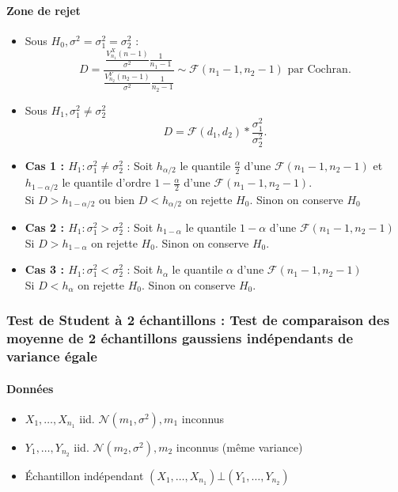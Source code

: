 \documentclass{article}
\theoremstyle{plain}%
\theoremstyle{definition}
\theoremstyle{remark}
\begin{document}
\paragraph*{Zone de rejet}
\begin{itemize}
    \item Sous $ H_0, \sigma ^2 = \sigma _1^2 = \sigma _2^2 $ : 
    \[
        D = \frac{\frac{V_{n_1}^X (n-1)}{\sigma ^2} \frac{1}{n_1-1}}{\frac{V_{n_2}^Y (n_2 -1)}{\sigma ^2} \frac{1}{n_2-1}} \sim \mathcal{F}(n_1 - 1, n_2 - 1) \text{ par Cochran}
    .\]
    \item Sous $ H_1, \sigma _1^2 \neq \sigma _2^2 $ 
    \[
        D = \mathcal{F}(d_1, d_2) * \frac{\sigma _1^2}{\sigma _2^2}
    .\]
\end{itemize}
\begin{itemize}
    \item \textbf{Cas 1 : $ H_1: \sigma _1^2 \neq \sigma _2^2 $ } : Soit $ h_{\alpha /2} $ le quantile $ \frac{\alpha }{2} $ d'une $ \mathcal{F}(n_1-1, n_2 - 1) $  et $ h_{1- \alpha /2} $ le quantile d'ordre $ 1 - \frac{\alpha }{2} $ d'une $ \mathcal{F}(n_1 - 1, n_2 - 1) $. \\
    Si $ D > h_{1 - \alpha /2} $ ou bien $ D < h_{\alpha /2} $ on rejette $ H_0 $. Sinon on conserve $ H_0 $ 

    \item \textbf{Cas 2 : $ H_1: \sigma _1^2 > \sigma _2^2 $ } : Soit $ h_{1 - \alpha} $ le quantile $ 1 -\alpha  $ d'une $ \mathcal{F}(n_1-1, n_2 - 1) $ \\
    Si $ D > h_{1 - \alpha} $ on rejette $ H_0 $. Sinon on conserve $ H_0 $.

    \item \textbf{Cas 3 : $ H_1: \sigma _1^2 < \sigma _2^2 $ } : Soit $ h_{\alpha} $ le quantile $ \alpha $ d'une $ \mathcal{F}(n_1-1, n_2 - 1) $ \\
    Si $ D < h_{\alpha} $ on rejette $ H_0 $. Sinon on conserve $ H_0 $.
\end{itemize}

\subsubsection{Test de Student à 2 échantillons : Test de comparaison des moyenne de 2 échantillons gaussiens indépendants de variance égale}

\paragraph*{Données}
\begin{itemize}
    \item $ X_1, \dots, X_{n_1}  $ iid. $ \mathcal{N}(m_1, \sigma ^2), m_1 $ inconnus
    \item $ Y_1, \dots, Y_{n_2}  $ iid. $ \mathcal{N}(m_2, \sigma ^2), m_2 $ inconnus (même variance)
    \item Échantillon indépendant $ (X_1, \dots, X_{n_1}) \bot (Y_1, \dots, Y_{n_2}) $ 
\end{itemize}
\end{document}

